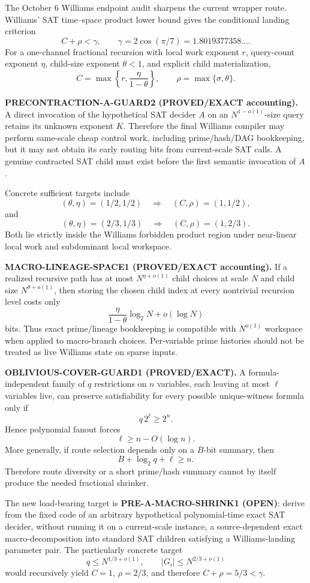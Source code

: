\documentclass[11pt]{article}
\theoremstyle{plain}
\theoremstyle{definition}
\theoremstyle{remark}
\begin{document}
The October 6 Williams endpoint audit sharpens the current wrapper route.
Williams' SAT time--space product lower bound gives the conditional landing
criterion
\[
\boxed{
C+\rho<\gamma,
\qquad
\gamma=2\cos(\pi/7)=1.8019377358\ldots.
}
\]
For a one-channel fractional recursion with local work exponent \(r\),
query-count exponent \(\eta\), child-size exponent \(\theta<1\), and explicit
child materialization,
\[
C=\max\left\{r,\frac{\eta}{1-\theta}\right\},
\qquad
\rho=\max\{\sigma,\theta\}.
\]

\textbf{PRECONTRACTION-A-GUARD2 (PROVED/EXACT accounting).}
A direct invocation of the hypothetical SAT decider \(A\) on an
\(N^{1-o(1)}\)-size query retains its unknown exponent \(K\).  Therefore the
final Williams compiler may perform same-scale cheap control work, including
prime/hash/DAG bookkeeping, but it may not obtain its early routing bits from
current-scale SAT calls.  A genuine contracted SAT child must exist before the
first semantic invocation of \(A\).

Concrete sufficient targets include
\[
(\theta,\eta)=(1/2,1/2)
\quad\Longrightarrow\quad
(C,\rho)=(1,1/2),
\]
and
\[
(\theta,\eta)=(2/3,1/3)
\quad\Longrightarrow\quad
(C,\rho)=(1,2/3).
\]
Both lie strictly inside the Williams forbidden product region under
near-linear local work and subdominant local workspace.

\textbf{MACRO-LINEAGE-SPACE1 (PROVED/EXACT accounting).}
If a realized recursive path has at most \(N^{\eta+o(1)}\) child choices at
scale \(N\) and child size \(N^{\theta+o(1)}\), then storing the chosen child
index at every nontrivial recursion level costs only
\[
\frac{\eta}{1-\theta}\log_2N+o(\log N)
\]
bits.  Thus exact prime/lineage bookkeeping is compatible with
\(N^{o(1)}\) workspace when applied to macro-branch choices.  Per-variable
prime histories should not be treated as live Williams state on sparse inputs.

\textbf{OBLIVIOUS-COVER-GUARD1 (PROVED/EXACT).}
A formula-independent family of \(q\) restrictions on \(n\) variables, each
leaving at most \(\ell\) variables live, can preserve satisfiability for every
possible unique-witness formula only if
\[
q\,2^\ell\ge2^n.
\]
Hence polynomial fanout forces
\[
\ell\ge n-O(\log n).
\]
More generally, if route selection depends only on a \(B\)-bit summary, then
\[
B+\log_2q+\ell\ge n.
\]
Therefore route diversity or a short prime/hash summary cannot by itself
produce the needed fractional shrinker.

The new load-bearing target is
\textbf{PRE-A-MACRO-SHRINK1 (OPEN)}: derive from the fixed code of an arbitrary
hypothetical polynomial-time exact SAT decider, without running it on a
current-scale instance, a source-dependent exact macro-decomposition into
standard SAT children satisfying a Williams-landing parameter pair.  The
particularly concrete target
\[
q\le N^{1/3+o(1)},
\qquad
|G_i|\le N^{2/3+o(1)}
\]
would recursively yield \(C=1\), \(\rho=2/3\), and therefore
\(C+\rho=5/3<\gamma\).
\end{document}
